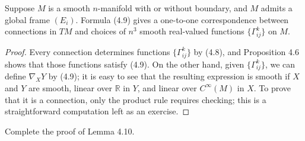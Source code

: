 \begin{lemma}
\label{lem:connections-from-connection-coefficients}
Suppose $M$ is a smooth $n$-manifold with or without boundary, and $M$ admits a global frame $(E_i)$. Formula (4.9) gives a one-to-one correspondence between connections in $TM$ and choices of $n^3$ smooth real-valued functions $\{\Gamma^k_{ij}\}$ on $M$.
\end{lemma}

\begin{proof}
Every connection determines functions $\{\Gamma^k_{ij}\}$ by (4.8), and Proposition 4.6 shows that those functions satisfy (4.9). On the other hand, given $\{\Gamma^k_{ij}\}$, we can define $\nabla_X Y$ by (4.9); it is easy to see that the resulting expression is smooth if $X$ and $Y$ are smooth, linear over $\mathbb{R}$ in $Y$, and linear over $C^\infty(M)$ in $X$. To prove that it is a connection, only the product rule requires checking; this is a straightforward computation left as an exercise.
\end{proof}

\begin{exercise}
\label{exer:complete-proof-lemma-4.10}
\leanok
Complete the proof of Lemma 4.10.
\end{exercise}

